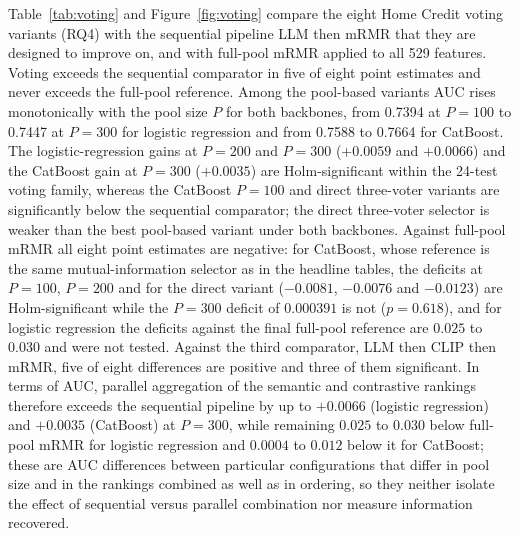 \documentclass[final,5p,twocolumn]{elsarticle}
\begin{document}
Table~\ref{tab:voting} and Figure~\ref{fig:voting} compare the eight Home Credit voting variants (RQ4) with the sequential pipeline LLM then mRMR that they are designed to improve on, and with full-pool mRMR applied to all 529 features. Voting exceeds the sequential comparator in five of eight point estimates and never exceeds the full-pool reference. Among the pool-based variants AUC rises monotonically with the pool size $P$ for both backbones, from 0.7394 at $P=100$ to 0.7447 at $P=300$ for logistic regression and from 0.7588 to 0.7664 for CatBoost. The logistic-regression gains at $P=200$ and $P=300$ ($+0.0059$ and $+0.0066$) and the CatBoost gain at $P=300$ ($+0.0035$) are Holm-significant within the 24-test voting family, whereas the CatBoost $P=100$ and direct three-voter variants are significantly below the sequential comparator; the direct three-voter selector is weaker than the best pool-based variant under both backbones. Against full-pool mRMR all eight point estimates are negative: for CatBoost, whose reference is the same mutual-information selector as in the headline tables, the deficits at $P=100$, $P=200$ and for the direct variant ($-0.0081$, $-0.0076$ and $-0.0123$) are Holm-significant while the $P=300$ deficit of $0.000391$ is not ($p=0.618$), and for logistic regression the deficits against the final full-pool reference are $0.025$ to $0.030$ and were not tested. Against the third comparator, LLM then CLIP then mRMR, five of eight differences are positive and three of them significant. In terms of AUC, parallel aggregation of the semantic and contrastive rankings therefore exceeds the sequential pipeline by up to $+0.0066$ (logistic regression) and $+0.0035$ (CatBoost) at $P=300$, while remaining $0.025$ to $0.030$ below full-pool mRMR for logistic regression and $0.0004$ to $0.012$ below it for CatBoost; these are AUC differences between particular configurations that differ in pool size and in the rankings combined as well as in ordering, so they neither isolate the effect of sequential versus parallel combination nor measure information recovered.
\end{document}
